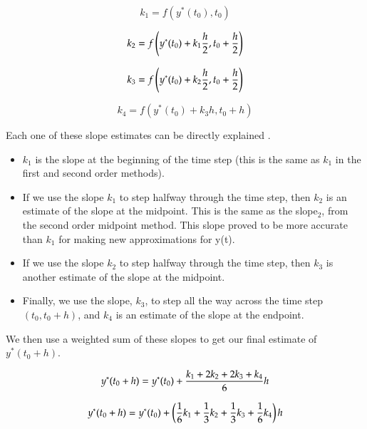 \newpage

\begin{equation}
    {k_1} = f({y^*}({t_0}),{t_0})
\end{equation}

\begin{equation}
    {k_2} = f\left( {{y^*}({t_0}) + {k_1}{h \over 2},{t_0} + {h \over 2}} \right)
\end{equation}

\begin{equation}
     {k_3} = f\left( {{y^*}({t_0}) + {k_2}{h \over 2},{t_0} + {h \over 2}} \right) 
\end{equation}

\begin{equation}
    {k_4} = f\left( {{y^*}({t_0}) + {k_3}h,{t_0} + h} \right)
\end{equation}

Each one of these slope estimates can be directly explained \cite{FourthOr20:online}.

\begin{itemize}
    \item $k_1$ is the slope at the beginning of the time step (this is the same as $k_1$ in the first and second order methods).
    
\item If we use the slope $k_1$ to step halfway through the time step, then $k_2$ is an estimate of the slope at the midpoint. This is the same as the slope$_2$, from the second order midpoint method. This slope proved to be more accurate than $k_1$ for making new approximations for y(t).

\item If we use the slope $k_2$ to step halfway through the time step, then $k_3$ is another estimate of the slope at the midpoint.

\item Finally, we use the slope, $k_3$, to step all the way across the time step$(t_0, t_0+h)$, and $k_4$ is an estimate of the slope at the endpoint. 
\end{itemize}

We then use a weighted sum of these slopes to get our final estimate of $y^*(t_0+h)$.

\begin{equation}
    {y^*}({t_0} + h) = {y^*}({t_0}) + {{{k_1} + 2{k_2} + 2{k_3} + {k_4}} \over 6}h 
\end{equation}



\begin{equation}
   {y^*}({t_0} + h) = {y^*}({t_0}) + \left( {{1 \over 6}{k_1} + {1 \over 3}{k_2} + {1 \over 3}{k_3} + {1 \over 6}{k_4}} \right)h
\end{equation}

